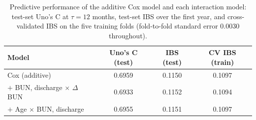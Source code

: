 \documentclass[11pt,a4paper]{article}
\newcommand{\dbun}{$\Delta$BUN}
\begin{document}
\begin{table}[H]
\centering
\caption{Predictive performance of the additive Cox model and each
interaction model: test-set Uno's C at $\tau = 12$ months, test-set IBS over the first year,
and cross-validated IBS on the five training folds (fold-to-fold standard error 0.0030
throughout).}
\label{tab:interperf}
\vspace{0.3em}
\small
\begin{tabular}{lccc}
\toprule
Model & Uno's C (test) & IBS (test) & CV IBS (train) \\
\midrule
Cox (additive)                          & 0.6959 & 0.1150 & 0.1097 \\
$+$ BUN, discharge $\times$ \dbun{}     & 0.6933 & 0.1152 & 0.1094 \\
$+$ Age $\times$ BUN, discharge         & 0.6955 & 0.1151 & 0.1097 \\
\bottomrule
\end{tabular}
\end{table}
\end{document}
